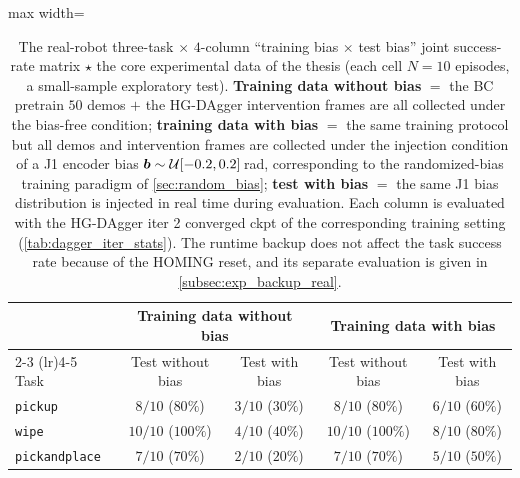 \begin{table}[htbp]
  \centering
  \caption{The real-robot three-task $\times$ $4$-column ``training bias $\times$ test bias'' joint success-rate matrix $\star$ the core experimental data of the thesis (each cell $N=10$ episodes, a small-sample exploratory test). \textbf{Training data without bias} $=$ the BC pretrain $50$ demos $+$ the HG-DAgger intervention frames are all collected under the bias-free condition; \textbf{training data with bias} $=$ the same training protocol but all demos and intervention frames are collected under the injection condition of a J1 encoder bias $\bm{b} \sim \mathcal{U}[-0.2, 0.2]$\,rad, corresponding to the randomized-bias training paradigm of \cref{sec:random_bias}; \textbf{test with bias} $=$ the same J1 bias distribution is injected in real time during evaluation. Each column is evaluated with the HG-DAgger iter 2 converged ckpt of the corresponding training setting (\cref{tab:dagger_iter_stats}). The runtime backup does not affect the task success rate because of the HOMING reset, and its separate evaluation is given in \cref{subsec:exp_backup_real}.}
  \label{tab:real_4col_matrix}
  \footnotesize
  \begin{adjustbox}{max width=\textwidth}
  \begin{tabular}{@{}lcccc@{}}
    \toprule
     & \multicolumn{2}{c}{Training data without bias} & \multicolumn{2}{c}{Training data with bias} \\
    \cmidrule(lr){2-3} \cmidrule(lr){4-5}
    Task & Test without bias & Test with bias & Test without bias & Test with bias \\
    \midrule
    \texttt{pickup}        & $8/10$ ($80\%$)   & $3/10$ ($30\%$) & $8/10$ ($80\%$)   & $6/10$ ($60\%$) \\
    \texttt{wipe}          & $10/10$ ($100\%$) & $4/10$ ($40\%$) & $10/10$ ($100\%$) & $8/10$ ($80\%$) \\
    \texttt{pickandplace}  & $7/10$ ($70\%$)   & $2/10$ ($20\%$) & $7/10$ ($70\%$)   & $5/10$ ($50\%$) \\
    \bottomrule
  \end{tabular}
  \end{adjustbox}
\end{table}

